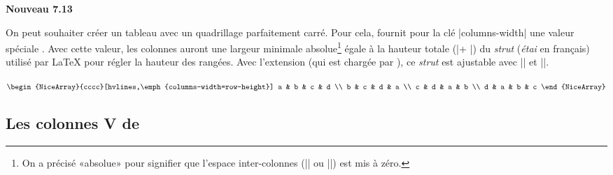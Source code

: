 \documentclass[dvipsnames]{article}
\begin{document}
\medskip
{}

\bigskip
\colorbox{yellow!50}{\bfseries Nouveau 7.13}

\smallskip
\nobreak
{}
On peut souhaiter créer un tableau avec un quadrillage parfaitement carré. Pour
cela,  fournit pour la clé |columns-width| une valeur spéciale
. Avec cette valeur, les colonnes auront une largeur minimale absolue\footnote{On a précisé «absolue» pour signifier que l'espace inter-colonnes (|\tabcolsep| ou |\arraycolsep|) est mis à zéro.}
égale à la hauteur totale (|\dp + \ht|) du \emph{strut} (\emph{étai} en français)
utilisé par LaTeX pour régler la hauteur des rangées. Avec l'extension
 (qui est chargée par ), ce \emph{strut} est
ajustable avec |\arraystretch| et |\extrarowheight|.

\medskip
\begin{Code}[width=12cm,show-output]
\renewcommand{\arraystretch}{1.5}
$\begin{NiceArray}{cccc}[hvlines,\emph{columns-width=row-height}]
a & b & c & d \\
b & c & d & a \\
c & d & a & b \\
d & a & b & c
\end{NiceArray}$
\end{Code}


\subsection{Les colonnes V de \texorpdfstring{}{varwidth}}
\end{document}
